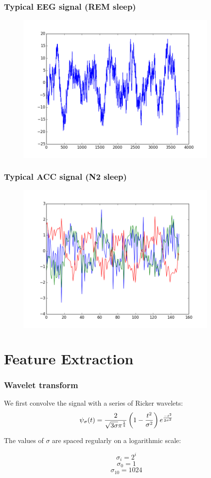 \documentclass{beamer}
\begin{document}
\begin{frame}
	\frametitle{Typical EEG signal (REM sleep)}
	\begin{figure}
		\centering
		\includegraphics[width=10cm]{../typical_eeg_REM.png}
	\end{figure}
\end{frame}

\begin{frame}
	\frametitle{Typical ACC signal (N2 sleep)}
	\begin{figure}
		\centering
		\includegraphics[width=10cm]{../typical_acc_2_N2.png}
	\end{figure}
\end{frame}

\section{Feature Extraction}
\frame{\sectionpage}

\begin{frame}
	\frametitle{Wavelet transform}
	We first convolve the signal with a series of Ricker wavelets:
	$$\psi_\sigma(t) = {2 \over {\sqrt {3\sigma}\pi^{1 \over 4}}} \left( 1 - {t^2 \over \sigma^2} \right) e^{-t^2 \over 2\sigma^2}$$

	The values of $\sigma$ are spaced regularly on a logarithmic scale:

	$$\sigma_i = 2^i$$
	$$\sigma_0 = 1$$
	$$\sigma_{10} = 1024$$
\end{frame}
\end{document}
